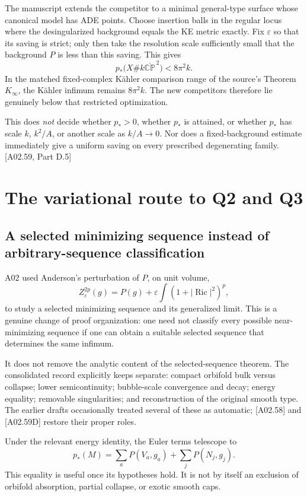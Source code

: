\documentclass[11pt]{article}
\newcommand{\Ric}{\operatorname{Ric}}
\newcommand{\CP}{\mathbb{CP}}
\newcommand{\sref}[1]{\textsf{[#1]}}
\theoremstyle{remark}
\begin{document}
The manuscript extends the competitor to a minimal general-type surface
whose canonical model has ADE points. Choose insertion balls in the regular
locus where the desingularized background equals the KE metric exactly.
Fix $\varepsilon$ so that its saving is strict; only then take the resolution
scale sufficiently small that the background $P$ is less than this saving.
This gives
\[
 p_*\bigl(X\#k\overline{\CP}^{\,2}\bigr)<8\pi^2k.
\]
In the matched fixed-complex K\"ahler comparison range of the source's
Theorem $K_\infty$, the K\"ahler infimum remains $8\pi^2k$. The new
competitors therefore lie genuinely below that restricted optimization.

This does \emph{not} decide whether $p_*>0$, whether $p_*$ is attained, or
whether $p_*$ has scale $k$, $k^2/A$, or another scale as $k/A\to0$.
Nor does a fixed-background estimate immediately give a uniform saving
on every prescribed degenerating family. \sref{A02.59, Part D.5}

\section{The variational route to Q2 and Q3}
\label{sec:variational}

\subsection{A selected minimizing sequence instead of arbitrary-sequence classification}
A02 used Anderson's perturbation of $P$, on unit volume,
\[
 Z^{2p}_\varepsilon(g)=P(g)+\varepsilon\int(1+|\Ric|^2)^p,
\]
to study a selected minimizing sequence and its generalized limit.
This is a genuine change of proof organization: one need not classify every
possible near-minimizing sequence if one can obtain a suitable selected
sequence that determines the same infimum.

It does not remove the analytic content of the selected-sequence theorem.
The consolidated record explicitly keeps separate: compact orbifold bulk
versus collapse; lower semicontinuity; bubble-scale convergence and decay;
energy equality; removable singularities; and reconstruction of the original
smooth type. The earlier drafts occasionally treated several of these as
automatic; \sref{A02.58} and \sref{A02.59D} restore their proper roles.

Under the relevant energy identity, the Euler terms telescope to
\[
 p_*(M)=\sum_aP(V_a,g_a)+\sum_jP(N_j,g_j).
\]
This equality is useful once its hypotheses hold. It is not by itself an
exclusion of orbifold absorption, partial collapse, or exotic smooth caps.
\end{document}
